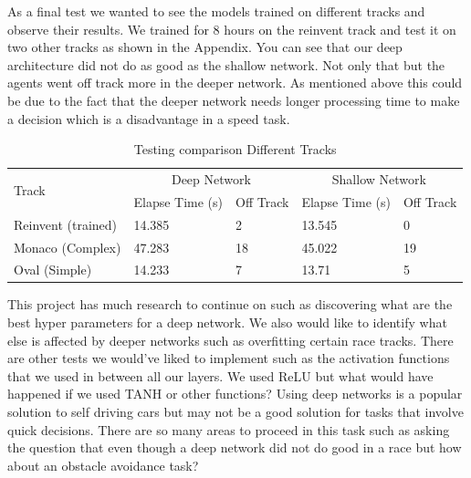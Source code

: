 \documentclass[journal]{IEEEtran}
\begin{document}
As a final test we wanted to see the models trained on different tracks and observe their results.  We trained for 8 hours on the reinvent track and test it on two other tracks as shown in the Appendix.  You can see that our deep architecture did not do as good as the shallow network.  Not only that but the agents went off track more in the deeper network.  As mentioned above this could be due to the fact that the deeper network needs longer processing time to make a decision which is a disadvantage in a speed task.

\begin{table}[t]
\centering
\caption{Testing comparison Different Tracks}
\begin{tabular}{ |p{1.5cm}|p{1.5cm}|p{1cm}|p{1.5cm}|p{1cm}| }
\hline
 \multirow{2}{4em}{Track} & \multicolumn{2}{|c|}{Deep Network} & \multicolumn{2}{|c|}{Shallow Network} \\
\cline{2-5}
 & Elapse Time (s) & Off Track &  Elapse Time (s) & Off Track  \\
\hline
Reinvent (trained) & 14.385	 & 2 & 13.545	 & 0 \\ 
 \hline
Monaco (Complex) & 47.283	 & 18 & 45.022	& 19 \\ 
 \hline
Oval (Simple) & 14.233	 & 7 & 13.71 & 5 \\ 
 \hline
\end{tabular}
\label{DiffRacetrackTest}
\end{table}


This project has much research to continue on such as discovering what are the best hyper parameters for a deep network.  We also would like to identify what else is affected by deeper networks such as overfitting certain race tracks.  There are other tests we would've liked to implement such as the activation functions that we used in between all our layers.  We used ReLU but what would have happened if we used TANH or other functions?  Using deep networks is a popular solution to self driving cars but may not be a good solution for tasks that involve quick decisions.  There are so many areas to proceed in this task such as asking the question that even though a deep network did not do good in a race but how about an obstacle avoidance task?
\end{document}
